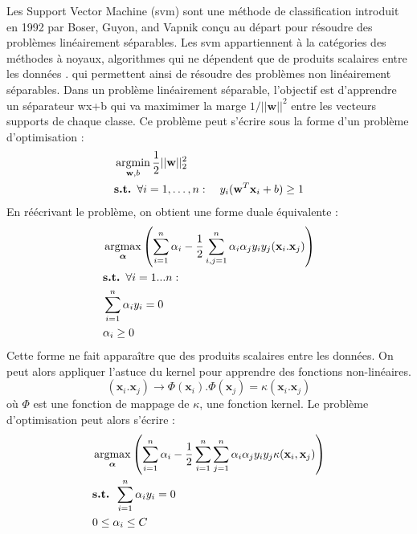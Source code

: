 Les Support Vector Machine ({\sc svm})  sont une méthode de classification introduit en 1992 par Boser, Guyon, and Vapnik \cite{Boser1992,Cortes1995} conçu au départ pour résoudre des problèmes linéairement séparables. Les {\sc svm} appartiennent à la catégories des méthodes à noyaux, algorithmes qui ne dépendent que de produits scalaires entre les données \cite{Schlkopf2013}. qui permettent ainsi de résoudre des problèmes non linéairement séparables. Dans un problème linéairement séparable, l'objectif est d'apprendre un séparateur wx+b qui va maximimer la marge $1/||\textbf{w}||^2$ entre les vecteurs supports de chaque classe. Ce problème peut s'écrire sous la forme d'un problème d'optimisation :
	\begin{align}
		& \argmin_{\textbf{w},b} \frac{1}{2} ||\textbf{w}||_2^2 \label{eq:objectiveSVM}\\
		& \textbf{s.t. } \forall i = 1,\ldots,n: \quad y_i(\textbf{w} ^T\textbf{x}_i+b) \geq 1 \label{eq:constraintsSVM}
	\end{align}
En réécrivant le problème, on obtient une forme duale équivalente :
\begin{align}
	& \argmax_{\boldsymbol{\alpha}} \left( 
	\sum\limits_{i=1}^{n} \alpha_i - \frac{1}{2} \sum\limits_{i,j=1}^{n} \alpha_i \alpha_j y_i y_j (\textbf{x}_i . \textbf{x}_j) 
	\right) 
	\label{eq:dualSVM}\\
	& \textbf{s.t. } \forall i = 1...n: \nonumber \\
	& \sum\limits_{i=1}^{n}\alpha_i y_i = 0 \label{constraintdual1}\\
	& \alpha_i \geq 0 \label{constraintdual2}
\end{align}
Cette forme ne fait apparaître que des produits scalaires entre les données. On peut alors appliquer l'astuce du kernel pour apprendre des fonctions non-linéaires.
\begin{equation}
(\textbf{x}_i . \textbf{x}_j) \rightarrow \Phi(\textbf{x}_i) . \Phi(\textbf{x}_j) = \kappa(\textbf{x}_i . \textbf{x}_j)
\end{equation}
\noindent où $\Phi$ est une fonction de mappage de $\kappa$, une fonction kernel. Le problème d'optimisation peut alors s'écrire :
\begin{align}
	& \argmax_{\boldsymbol{\alpha}} \left( 
	\sum\limits_{i=1}^{n} \alpha_i - \frac{1}{2} \sum\limits_{i=1}^{n} \sum\limits_{j=1}^{n} \alpha_i \alpha_j y_i y_j \kappa(\textbf{x}_i , \textbf{x}_j) 
	\right) 
	\label{eq:dualSVM2kernel}\\
	& \textbf{s.t. } \sum\limits_{i=1}^{n}\alpha_i y_i = 0 \label{constraintdual3kernel}\\
	& 0 \leq \alpha_i \leq C  \label{constraintdual4kernel}
\end{align}
